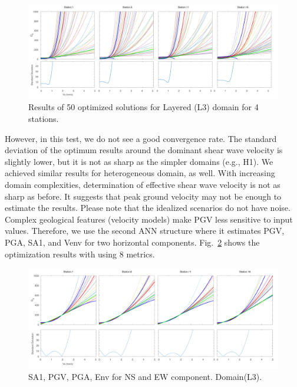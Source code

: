   \begin{figure}[ht]
    \centering
    \includegraphics[width=\textwidth]{figures/pdf/Figure_17-L3-pgv.pdf}
    \caption{Results of 50 optimized solutions for Layered (L3) domain for 4 stations.}
    \label{fig:station_1_2000_1000_500_L3_nt}
\end{figure}

However, in this test, we do not see a good convergence rate. The standard deviation of the optimum results around the dominant shear wave velocity is slightly lower, but it is not as sharp as the simpler domains (e.g., H1). We achieved similar results for heterogeneous domain, as well. With increasing domain complexities, determination of effective shear wave velocity is not as sharp as before. It suggests that peak ground velocity may not be enough to estimate the results. Please note that the idealized scenarios do not have noise. Complex geological features (velocity models) make PGV less sensitive to input values. Therefore, we use the second ANN structure where it estimates PGV, PGA, SA1, and Venv for two horizontal components. Fig.~\ref{fig:station_8_param_2000_1000_500} shows the optimization results with using 8 metrics. 

  \begin{figure}[ht]
    \centering
    \includegraphics[width=\textwidth]{figures/pdf/Figure_18-L3-8metric.pdf}
    \caption{SA1, PGV, PGA, Env for NS and EW component. Domain(L3).  }
    \label{fig:station_8_param_2000_1000_500}
\end{figure}

